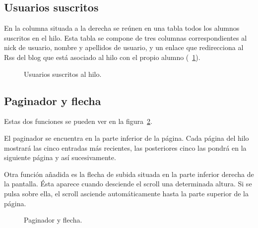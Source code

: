 \documentclass[a4paper, 12pt]{book}
\begin{document}
\subsection{Usuarios suscritos}
En la columna situada a la derecha se re\'unen en una tabla todos los alumnos suscritos en el hilo. Esta tabla se compone de tres columnas correspondientes
al nick de usuario, nombre y apellidos de usuario, y un enlace que redirecciona al Rss del blog que est\'a asociado al hilo con el propio alumno 
(~\ref{figura:hiloalumno4}).
\begin{figure}[htbp] 
  \centering
  \caption{Usuarios suscritos al hilo.}
  \label{figura:hiloalumno4}
\end{figure}

\subsection{Paginador y flecha}
Estas dos funciones se pueden ver en la figura~\ref{figura:hiloalumno5}.

El paginador se encuentra en la parte inferior de la p\'agina. Cada p\'agina del hilo mostrar\'a las cinco entradas m\'as recientes, las posteriores cinco 
las pondr\'a en la siguiente p\'agina y as\'i sucesivamente.

Otra funci\'on a\~nadida es la flecha de subida situada en la parte inferior derecha de la pantalla. \'Esta aparece cuando desciende el scroll una 
determinada altura. Si se pulsa sobre ella, el scroll asciende autom\'aticamente hasta la parte superior de la p\'agina.
\begin{figure}[htbp] 
  \centering
  \caption{Paginador y flecha.}
  \label{figura:hiloalumno5}
\end{figure}
\end{document}
